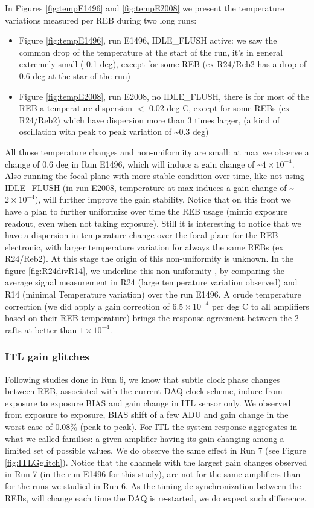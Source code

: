In Figures \ref{fig:tempE1496} and \ref{fig:tempE2008} we present the temperature variations measured per REB during two long runs:  

\begin{itemize}
\item Figure \ref{fig:tempE1496}, run E1496, IDLE\_FLUSH active: we saw the common drop of the temperature at the start of the run, it’s in general extremely small (-0.1 deg), except for some REB (ex R24/Reb2 has a drop of 0.6 deg at the star of the run) 
\item Figure \ref{fig:tempE2008}, run E2008, no IDLE\_FLUSH, there is for most of the REB a temperature dispersion $<$ 0.02 deg C, except for some REBs (ex R24/Reb2) which have dispersion more than 3 times larger, (a kind of oscillation with peak to peak variation of \textasciitilde 0.3 deg) 
\end{itemize}

All those temperature changes and non-uniformity are small: at max we observe a change of 0.6 deg in Run E1496, which will induce a gain change of \textasciitilde $4\times 10^{-4}$. Also running the focal plane with more stable condition over time, like not using IDLE\_FLUSH (in run E2008, temperature at max induces a gain change of \textasciitilde$2\times 10^{-4}$), will further improve the gain stability. Notice that on this front we have a plan to further uniformize over time the REB usage (mimic exposure readout, even when not taking exposure). Still it is interesting to notice that we have a dispersion in temperature change  over the focal plane for the REB electronic, with larger temperature variation for always the same REBs (ex R24/Reb2). At this stage the origin of this  non-uniformity is unknown. 
In the figure \ref{fig:R24divR14}, we underline this non-uniformity , by comparing the average signal measurement in R24 (large temperature variation observed) and R14 (minimal Temperature variation) over the run E1496. A crude temperature correction (we did apply a gain correction of $6.5\times10^{-4}$ per deg C to all amplifiers based on their REB temperature)  brings the response agreement between the 2 rafts at better than $1\times10^{-4}$.  


\clearpage
\subsubsection{ITL gain glitches} 
Following studies done in Run 6, we know that subtle clock phase changes between REB, associated with the current DAQ clock scheme, induce from exposure to exposure BIAS and gain change in ITL sensor only.  We observed from exposure to exposure, BIAS shift of a few ADU and gain change in the worst case of 0.08\% (peak to peak). For ITL the system response aggregates in what we called families: a given amplifier having its gain changing among a limited set of possible values. We do observe the same effect in Run 7 (see Figure \ref{fig:ITLGglitch}). Notice that the channels with the largest gain changes observed in Run 7 (in the run E1496 for this study), are  not for the same amplifiers than for the runs we studied in Run 6. As the timing de-synchronization between the REBs, will change each time the DAQ is re-started, we do expect such difference.

